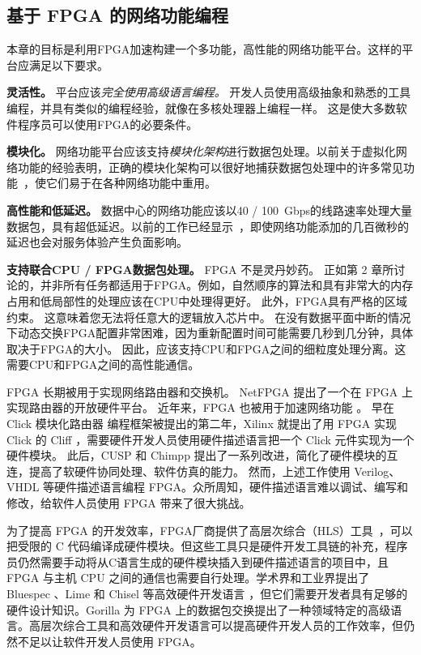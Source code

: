 \subsection{基于 FPGA 的网络功能编程}

本章的目标是利用FPGA加速构建一个多功能，高性能的网络功能平台。这样的平台应满足以下要求。

\textbf {灵活性。} 平台应该\textit {完全使用高级语言编程。}
开发人员使用高级抽象和熟悉的工具编程，并具有类似的编程经验，就像在多核处理器上编程一样。
这是使大多数软件程序员可以使用FPGA的必要条件。

\textbf {模块化。} 网络功能平台应该支持\textit {模块化架构}进行数据包处理。以前关于虚拟化网络功能的经验表明，正确的模块化架构可以很好地捕获数据包处理中的许多常见功能~\cite {kohler2000click,martins2014clickos}，使它们易于在各种网络功能中重用。

\textbf {高性能和低延迟。} 数据中心的网络功能应该以40 / 100~Gbps的线路速率处理大量数据包，具有超低延迟。以前的工作已经显示~\cite {rollback-mb}，即使网络功能添加的几百微秒的延迟也会对服务体验产生负面影响。

\textbf {支持联合CPU / FPGA数据包处理。} FPGA 不是灵丹妙药。
正如第 2 章所讨论的，并非所有任务都适用于FPGA。例如，自然顺序的算法和具有非常大的内存占用和低局部性的处理应该在CPU中处理得更好。
此外，FPGA具有严格的区域约束。
这意味着您无法将任意大的逻辑放入芯片中。
在没有数据平面中断的情况下动态交换FPGA配置非常困难，因为重新配置时间可能需要几秒到几分钟，具体取决于FPGA的大小。
因此，应该支持CPU和FPGA之间的细粒度处理分离。这需要CPU和FPGA之间的高性能通信。


FPGA 长期被用于实现网络路由器和交换机。
NetFPGA \cite{lockwood2007netfpga} 提出了一个在 FPGA 上实现路由器的开放硬件平台。
近年来，FPGA 也被用于加速网络功能 \cite {rubow2010chimpp,lavasani2012compiling}。
早在 Click 模块化路由器 \cite{kohler2000click} 编程框架被提出的第二年，Xilinx 就提出了用 FPGA 实现 Click 的 Cliff \cite{kulkarni2004mapping}，需要硬件开发人员使用硬件描述语言把一个 Click 元件实现为一个硬件模块。
此后，CUSP \cite{schelle2005cusp} 和 Chimpp \cite {rubow2010chimpp} 提出了一系列改进，简化了硬件模块的互连，提高了软硬件协同处理、软件仿真的能力。
然而，上述工作使用 Verilog、VHDL 等硬件描述语言编程 FPGA。众所周知，硬件描述语言难以调试、编写和修改，给软件人员使用 FPGA 带来了很大挑战。

为了提高 FPGA 的开发效率，FPGA厂商提供了高层次综合（HLS）工具~\cite{vivado,intel-hls}，可以把受限的 C 代码编译成硬件模块。但这些工具只是硬件开发工具链的补充，程序员仍然需要手动将从C语言生成的硬件模块插入到硬件描述语言的项目中，且 FPGA 与主机 CPU 之间的通信也需要自行处理。学术界和工业界提出了 Bluespec \cite{bluespec}、Lime \cite{auerbach2010lime} 和 Chisel \cite{bachrach2012chisel} 等高效硬件开发语言 \cite{bacon2013fpga,singh2011implementing,wester2015transformation}，但它们需要开发者具有足够的硬件设计知识。Gorilla \cite {lavasani2012compiling} 为 FPGA 上的数据包交换提出了一种领域特定的高级语言。高层次综合工具和高效硬件开发语言可以提高硬件开发人员的工作效率，但仍然不足以让软件开发人员使用 FPGA。


